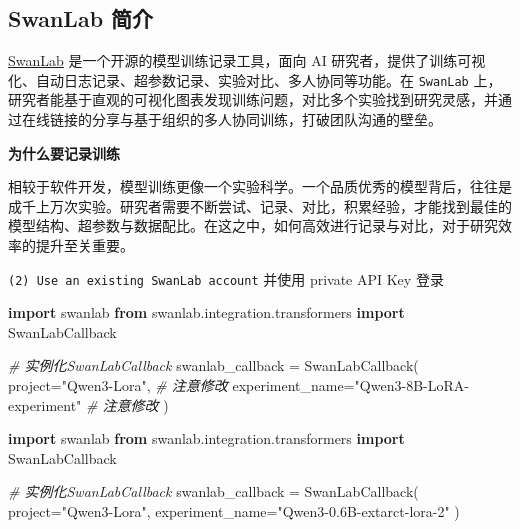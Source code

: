 \documentclass[
]{article}
\newenvironment{Shaded}{}{}
\newcommand{\CommentTok}[1]{\textcolor[rgb]{0.38,0.63,0.69}{\textit{#1}}}
\newcommand{\ImportTok}[1]{\textcolor[rgb]{0.00,0.50,0.00}{\textbf{#1}}}
\newcommand{\NormalTok}[1]{#1}
\newcommand{\OperatorTok}[1]{\textcolor[rgb]{0.40,0.40,0.40}{#1}}
\newcommand{\StringTok}[1]{\textcolor[rgb]{0.25,0.44,0.63}{#1}}
\begin{document}
\subsection{SwanLab 简介}\label{swanlab-ux7b80ux4ecb}

\href{https://github.com/swanhubx/swanlab}{SwanLab}
是一个开源的模型训练记录工具，面向 AI
研究者，提供了训练可视化、自动日志记录、超参数记录、实验对比、多人协同等功能。在
\texttt{SwanLab}
上，研究者能基于直观的可视化图表发现训练问题，对比多个实验找到研究灵感，并通过在线链接的分享与基于组织的多人协同训练，打破团队沟通的壁垒。

\textbf{为什么要记录训练}

相较于软件开发，模型训练更像一个实验科学。一个品质优秀的模型背后，往往是成千上万次实验。研究者需要不断尝试、记录、对比，积累经验，才能找到最佳的模型结构、超参数与数据配比。在这之中，如何高效进行记录与对比，对于研究效率的提升至关重要。

\texttt{(2)\ Use\ an\ existing\ SwanLab\ account} 并使用 private API Key
登录

\begin{Shaded}
\begin{Highlighting}[]
\ImportTok{import}\NormalTok{ swanlab}
\ImportTok{from}\NormalTok{ swanlab.integration.transformers }\ImportTok{import}\NormalTok{ SwanLabCallback}

\CommentTok{\# 实例化SwanLabCallback}
\NormalTok{swanlab\_callback }\OperatorTok{=}\NormalTok{ SwanLabCallback(}
\NormalTok{    project}\OperatorTok{=}\StringTok{"Qwen3{-}Lora"}\NormalTok{,  }\CommentTok{\# 注意修改}
\NormalTok{    experiment\_name}\OperatorTok{=}\StringTok{"Qwen3{-}8B{-}LoRA{-}experiment"}  \CommentTok{\# 注意修改}
\NormalTok{)}
\end{Highlighting}
\end{Shaded}

\begin{Shaded}
\begin{Highlighting}[]
\ImportTok{import}\NormalTok{ swanlab}
\ImportTok{from}\NormalTok{ swanlab.integration.transformers }\ImportTok{import}\NormalTok{ SwanLabCallback}

\CommentTok{\# 实例化SwanLabCallback}
\NormalTok{swanlab\_callback }\OperatorTok{=}\NormalTok{ SwanLabCallback(}
\NormalTok{    project}\OperatorTok{=}\StringTok{"Qwen3{-}Lora"}\NormalTok{,}
\NormalTok{    experiment\_name}\OperatorTok{=}\StringTok{"Qwen3{-}0.6B{-}extarct{-}lora{-}2"}
\NormalTok{)}
\end{Highlighting}
\end{Shaded}
\end{document}
